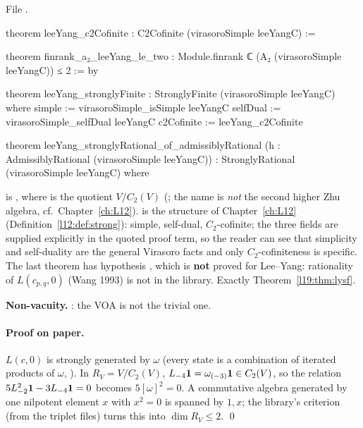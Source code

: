 \noindent File .
\begin{leancode}
theorem leeYang_c2Cofinite : C2Cofinite (virasoroSimple leeYangC) :=

theorem finrank_a₂_leeYang_le_two :
    Module.finrank ℂ (A₂ (virasoroSimple leeYangC)) ≤ 2 := by

theorem leeYang_stronglyFinite : StronglyFinite (virasoroSimple leeYangC) where
  simple := virasoroSimple_isSimple leeYangC
  selfDual := virasoroSimple_selfDual leeYangC
  c2Cofinite := leeYang_c2Cofinite

theorem leeYang_stronglyRational_of_admissiblyRational
    (h : AdmissiblyRational (virasoroSimple leeYangC)) :
    StronglyRational (virasoroSimple leeYangC) where
\end{leancode}

\begin{dictionary}
 is , where  is the quotient
$V/C_2(V)$ (; the name  is \emph{not} the second higher
Zhu algebra, cf.\ Chapter~\ref{ch:L12}).  is the structure of
Chapter~\ref{ch:L12} (Definition~\ref{l12:def:strong}): simple, self-dual, $C_2$-cofinite; the three fields
are supplied explicitly in the quoted proof term, so the reader can see that simplicity and self-duality are the
general Virasoro facts and only $C_2$-cofiniteness is specific. The last theorem has hypothesis
, which is \textbf{not} proved for Lee--Yang: rationality of $L(c_{p,q},0)$ (Wang 1993)
is not in the library. Exactly Theorem~\ref{l19:thm:lysf}.

\textbf{Non-vacuity.} \allowbreak{}\allowbreak{}\allowbreak{}: the VOA is not the trivial one.
\end{dictionary}

\paragraph{Proof on paper.} $L(c,0)$ is strongly generated by $\omega$ (every state is a combination of
iterated products of $\omega$, \allowbreak{}\allowbreak{}\allowbreak{}\allowbreak{}). In
$R_V = V/C_2(V)$, $L_{-4}\mathbf{1} = \omega_{(-3)}\mathbf{1}\in C_2(V)$, so the relation $5L_{-2}^2\mathbf{1} -
3L_{-4}\mathbf{1} = 0$ becomes $5[\omega]^2 = 0$. A commutative algebra generated by one nilpotent element
$x$ with $x^2 = 0$ is spanned by $1,x$; the library's criterion \allowbreak{}\allowbreak{}\allowbreak{}\allowbreak{}
(from the triplet files) turns this into $\dim R_V\le2$. \qed

